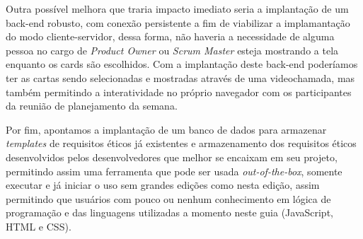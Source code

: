 Outra possível melhora que traria impacto imediato seria a implantação de um back-end robusto, com conexão persistente a fim de viabilizar a implamantação do modo cliente-servidor, dessa forma, não haveria a necessidade de alguma pessoa no cargo de \textit{Product Owner} ou \textit{Scrum Master} esteja mostrando a tela enquanto os cards são escolhidos. Com a implantação deste back-end poderíamos ter as cartas sendo selecionadas e mostradas através de uma videochamada, mas também permitindo a interatividade no próprio navegador com os participantes da reunião de planejamento da semana. 

Por fim, apontamos a implantação de um banco de dados para armazenar \textit{templates} de requisitos éticos já existentes e armazenamento dos requisitos éticos desenvolvidos pelos desenvolvedores que melhor se encaixam em seu projeto, permitindo assim uma ferramenta que pode ser usada \textit{out-of-the-box}, somente executar e já iniciar o uso sem grandes edições como nesta edição, assim permitindo que usuários com pouco ou nenhum conhecimento em lógica de programação e das linguagens utilizadas a momento neste guia (JavaScript, \acrshort{HTML} e \acrshort{CSS}).